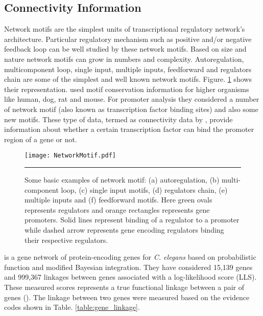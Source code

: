 \subsection{Connectivity Information}
Network motifs are the simplest units of transcriptional regulatory network's architecture. Particular regulatory mechanism such as positive and/or negative feedback loop can be well studied by these network motifs. Based on size and nature network motifs can grow in numbers and complexity. Autoregulation, multicomponent loop, single input, multiple inputs, feedforward and regulators chain are some of the simplest and well known network motifs. Figure. \ref{fig:networkMotif} shows their representation. \cite{Xie:2005} used motif conservation information for higher organisms like human, dog, rat and mouse. For promoter analysis they considered a number of network motif (also known as transcription factor binding sites) and also some new motifs. These type of data, termed as connectivity data by \cite{Liao:2003}, provide information about whether a certain transcription factor can bind the promoter region of a gene or not.

\begin{figure}
	\centering
		\texttt{[image: NetworkMotif.pdf]}
		\rule{35em}{0.5pt}
	\caption[Basic examples of network motif]
		{Some basic examples of network motif: (a) autoregulation, (b) multi-component loop, (c) single input motifs, (d) regulators chain, (e) multiple inputs and (f) feedforward motifs. Here green ovals represents regulators and orange rectangles represents gene promoters. Solid lines represent binding of a regulator to a promoter while dashed arrow represents gene encoding regulators binding their respective regulators.}
	\label{fig:networkMotif}
\end{figure}

\cite{WormNet} is a gene network of protein-encoding genes for \textit{C. elegans} based on probabilistic function and modified Bayesian integration. They have considered 15,139 genes and 999,367 linkages between genes associated with a log-likelihood score (LLS). These measured scores represents a true functional linkage between a pair of genes (\cite{Lee:2007}). The linkage between two genes were measured based on the evidence codes shown in Table. \ref{table:gene_linkage}.

